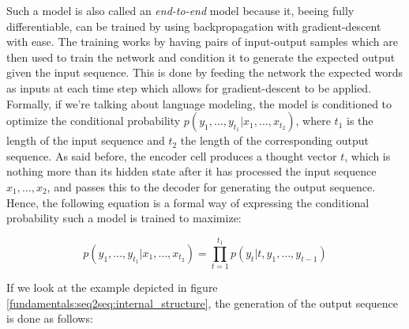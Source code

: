 Such a model is also called an \emph{end-to-end} model because it, beeing fully differentiable, can be trained by using backpropagation with gradient-descent with ease. The training works by having pairs of input-output samples which are then used to train the network and condition it to generate the expected output given the input sequence. This is done by feeding the network the expected words as inputs at each time step which allows for gradient-descent to be applied. Formally, if we're talking about language modeling, the model is conditioned to optimize the conditional probability $p(y_1,\dots,y_{t_1}|x_1,\dots,x_{t_2})$, where $t_1$ is the length of the input sequence and $t_2$ the length of the corresponding output sequence. As said before, the encoder cell produces a thought vector $t$, which is nothing more than its hidden state after it has processed the input sequence $x_1,\dots,x_2$, and passes this to the decoder for generating the output sequence. Hence, the following equation is a formal way of expressing the conditional probability such a model is trained to maximize:

\begin{equation}
p(y_1,\dots,y_{t_1}|x_1,\dots,x_{t_2}) = \prod_{t=1}^{t_1} p(y_t|t,y_1,\dots,y_{t-1})
\end{equation}

If we look at the example depicted in figure \ref{fundamentals:seq2seq:internal_structure}, the generation of the output sequence is done as follows:


